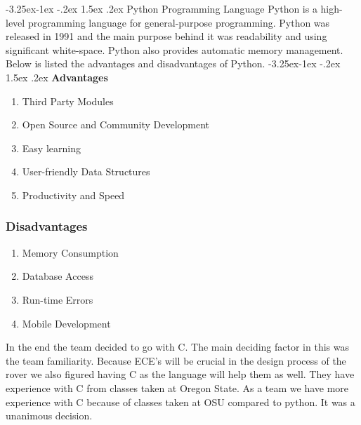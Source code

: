 \documentclass[onecolumn, draftclsnofoot, 10pt, compsoc]{IEEEtran}
\makeatletter
\renewcommand\paragraph{\@startsection{paragraph}{4}{\z@}%
                                     {-3.25ex\@plus -1ex \@minus -.2ex}%
                                     {1.5ex \@plus .2ex}%
                                     {\normalfont\normalsize\bfseries}}
\makeatother
\begin{document}
    \paragraph{Python Programming Language}
    Python is a high-level programming language for general-purpose programming. Python was released in 1991 and the main purpose behind it was readability and using significant white-space. Python also provides automatic memory management. Below is listed the advantages and disadvantages of Python. 
    \paragraph{\textbf{Advantages}}
    \begin{enumerate}
        \item Third Party Modules
        \item Open Source and Community Development
        \item Easy learning 
        \item User-friendly Data Structures 
        \item Productivity and Speed
    \end{enumerate}
    \subsubsection{\textbf{Disadvantages}}
    \begin{enumerate}
        \item Memory Consumption
        \item Database Access
        \item Run-time Errors
        \item Mobile Development
    \end{enumerate} 
    In the end the team decided to go with C. The main deciding factor in this was the team familiarity. Because ECE's will be crucial in the design process of the rover we also figured having C as the language will help them as well. They have experience with C from classes taken at Oregon State. As a team we have more experience with C because of classes taken at OSU compared to python. It was a unanimous decision. \\
    
\end{document}
